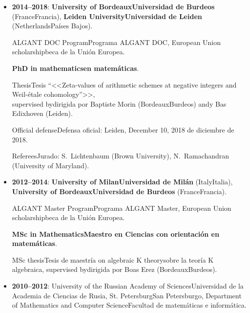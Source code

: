 \documentclass{article}
\newcommand{\biling}[2]{\ifdefined\english#1\fi\ifdefined\spanish#2\fi}
\begin{document}
\begin{itemize}
\item \textbf{2014--2018}: \textbf{\biling{University of Bordeaux}{Universidad de Burdeos}} (\biling{France}{Francia}),
  \textbf{\biling{Leiden University}{Universidad de Leiden}} (\biling{Netherlands}{Países Bajos}).

  \biling{ALGANT DOC Program}{Programa ALGANT DOC}, \biling{European Union scholarship}{beca de la Unión Europea}.

  \textbf{PhD \biling{in mathematics}{en matemáticas}}.

  \biling{Thesis}{Tesis} \biling{``}{<<}Zeta-values of arithmetic schemes at negative integers and Weil-étale cohomology\biling{''}{>>},\\
  \biling{supervised by}{dirigida por} Baptiste Morin (\biling{Bordeaux}{Burdeos}) \biling{and}{y} Bas Edixhoven (Leiden).

  \biling{Official defense}{Defensa oficial}: Leiden, \biling{December 10, 2018}{10 de diciembre de 2018}.

  \biling{Referees}{Jurado}:
  S.~Lichtenbaum (Brown University),
  N.~Ramachandran (University of Maryland).

\iffalse
  \biling{Examining committee}{Jurado}:
  P.~Cassou-Noguès (Université de Bordeaux),
  Ph.~Cassou-Noguès (Université de Bordeaux),
  D.~Holmes (Universiteit Leiden)
  R.~de Jeu (Vrije Universiteit Amsterdam),
  W.~van der Kallen (Universiteit Utrecht),
  H.~Lenstra (Universiteit Leiden),
  P.~Stevenhagen (Universiteit Leiden).
\fi

\item \textbf{2012--2014}: \textbf{\biling{University of Milan}{Universidad de Milán}} (\biling{Italy}{Italia}),
  \textbf{\biling{University of Bordeaux}{Universidad de Burdeos}} (\biling{France}{Francia}).

  \biling{ALGANT Master Program}{Programa ALGANT Master}, \biling{European Union scholarship}{beca de la Unión Europea}.

  \textbf{\biling{MSc in Mathematics}{Maestro en Ciencias con orientación en matemáticas}}.

  \biling{MSc thesis}{Tesis de maestría}
  \biling{on algebraic K theory}{sobre la teoría K algebraica},
  \biling{supervised by}{dirigida por} Boas Erez (\biling{Bordeaux}{Burdeos}).

\item \textbf{2010--2012}: \biling{University of the Russian Academy of Sciences}{Universidad de la Academia de Ciencias de Rusia},
  \biling{St. Petersburg}{San Petersburgo}, \biling{Department of Mathematics and Computer Science}{Facultad de matemáticas e informática}.


\end{itemize}
\end{document}
